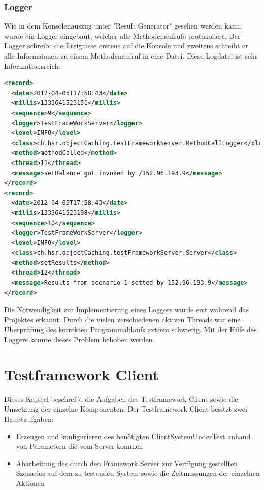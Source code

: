 \subsubsection{Logger}
\label{sec:logger}
Wie in dem Konsolenauszug unter "Result Generator" gesehen werden kann, wurde ein Logger eingebaut, welcher alle Methodenaufrufe protokoliert. Der Logger schreibt die Ereignisse erstens auf die Konsole und zweitens schreibt er alle Informaionen zu einem Methodenaufruf in eine Datei. Diese Logdatei ist sehr Informationsreich:

\begin{lstlisting}[language=XML, breaklines=true]
<record>
  <date>2012-04-05T17:58:43</date>
  <millis>1333641523151</millis>
  <sequence>9</sequence>
  <logger>TestFrameWorkServer</logger>
  <level>INFO</level>
  <class>ch.hsr.objectCaching.testFrameworkServer.MethodCallLogger</class>
  <method>methodCalled</method>
  <thread>11</thread>
  <message>setBalance got invoked by /152.96.193.9</message>
</record>
<record>
  <date>2012-04-05T17:58:43</date>
  <millis>1333641523198</millis>
  <sequence>10</sequence>
  <logger>TestFrameWorkServer</logger>
  <level>INFO</level>
  <class>ch.hsr.objectCaching.testFrameworkServer.Server</class>
  <method>setResults</method>
  <thread>12</thread>
  <message>Results from scenario 1 setted by 152.96.193.9</message>
</record>
\end{lstlisting}

Die Notwendigkeit zur Im\-pl\-emen\-tie\-rung eines Log\-gers wurde erst wäh\-rend das Projektes erkannt. Durch die vielen verschiedenen aktiven Threads war eine Überprüfung des korrekten Programmablaufs extrem schwierig. Mit der Hilfe des Loggers konnte dieses Problem behoben werden.

\section{Testframework Client}
\label{sec:test-FW Client}
Dieses Kapi\-tel beschreibt die Aufgaben des Testframework Client sowie die Umsetzung der einzelne Komponenten. Der Testframework Client besitzt zwei Hauptaufgaben:
\begin{itemize}
\item Erzeugen und konfigurieren des benötigten ClientSystemUnderTest anhand von Parametern die vom Server kommen
\item Abarbeitung des durch den Framework Server zur Verfügung gestellten Szenarios auf dem zu testenden System sowie die Zeitmessungen der einzelnen Aktionen
\end{itemize}

